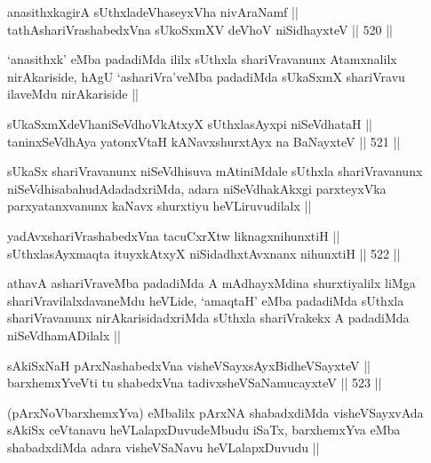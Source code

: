 \begin{shl}
anasithxkagirA sUthxladeVhaseyxVha nivAraNamf || \\
tathA\s shariVrashabedxVna sUkoSxmXV deVhoV niSidhayxteV ||  520 ||  
\end{shl}

\begin{artha}
`anasithxk' eMba padadiMda ililx sUthxla shariVravanunx Atamxnalilx
  nirAkariside, hAgU `ashariVra'veMba padadiMda sUkaSxmX shariVravu
  ilaveMdu nirAkariside ||
\end{artha}


\begin{shl}
sUkaSxmXdeVhaniSeVdhoVkAtxyX sUthxlasAyxpi niSeVdhataH || \\
taninxSeVdhAya yatonxV\s taH kANavxshurxtAyx na BaNayxteV ||  521 ||  
\end{shl}

\begin{artha}
sUkaSx shariVravanunx niSeVdhisuva mAtiniMdale sUthxla shariVravanunx
niSeVdhisabahudAdadadxriMda, adara niSeVdhakAkxgi parxteyxVka
parxyatanxvanunx kaNavx shurxtiyu heVLiruvudilalx ||
\end{artha}

\begin{shl}
yadAvx\s shariVrashabedxVna tacuCxrXtw liknagxnihunxtiH || \\
sUthxlasAyxmaqta ituyxkAtxyX niSidadhxtAvxnanx nihunxtiH ||  522 ||  
\end{shl}

\begin{artha}
athavA ashariVraveMba padadiMda A mAdhayxMdina shurxtiyalilx liMga
shariVravilalxdavaneMdu heVLide, `amaqtaH' eMba padadiMda sUthxla
shariVravanunx nirAkarisidadxriMda sUthxla shariVrakekx A padadiMda
niSeVdhamADilalx ||
\end{artha}

\begin{shl}
sAkiSxNaH pArxNashabedxVna visheVSayxsAyxBidheVSayxteV || \\
barxhemxYveVti tu shabedxVna tadivxsheVSaNamucayxteV ||  523 ||  
\end{shl}

\begin{artha}
(pArxNoVbarxhemxYva) eMbalilx pArxNA shabadxdiMda visheVSayxvAda
  sAkiSx ceVtanavu heVLalapxDuvudeMbudu iSaTx, barxhemxYva eMba
  shabadxdiMda adara visheVSaNavu heVLalapxDuvudu ||
\end{artha}

